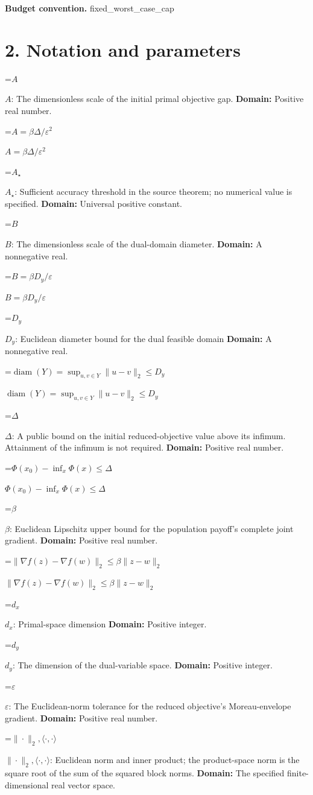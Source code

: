 \documentclass[10pt,a4paper]{article}
\newcommand{\AtlasMath}[1]{\par\begingroup\centering\setbox0=\hbox{$\displaystyle #1$}\ifdim\wd0>1.4\linewidth\typeout{ATLAS WIDE FORMULA: \the\wd0}\fi\ifdim\wd0>\linewidth\resizebox{\linewidth}{!}{\box0}\else\box0\fi\par\endgroup}
\newcommand{\AtlasInlineMath}[1]{\begingroup\setbox0=\hbox{$#1$}\ifdim\wd0>.4\linewidth\endgroup\AtlasMath{#1}\else\endgroup$#1$\fi}
\begin{document}
\textbf{Budget convention.} fixed\_worst\_case\_cap

\section{2. Notation and parameters}
\AtlasInlineMath{A}: The dimensionless scale of the initial primal objective gap. \textbf{Domain:} Positive real number.

\AtlasInlineMath{A=\beta\Delta/\varepsilon^2}

\AtlasInlineMath{A_\star}: Sufficient accuracy threshold in the source theorem; no numerical value is specified. \textbf{Domain:} Universal positive constant.

\AtlasInlineMath{B}: The dimensionless scale of the dual-domain diameter. \textbf{Domain:} A nonnegative real.

\AtlasInlineMath{B=\beta D_y/\varepsilon}

\AtlasInlineMath{D_y}: Euclidean diameter bound for the dual feasible domain \textbf{Domain:} A nonnegative real.

\AtlasInlineMath{\operatorname{diam}(Y)=\sup_{u,v\in Y}\|u-v\|_2\le D_y}

\AtlasInlineMath{\Delta}: A public bound on the initial reduced-objective value above its infimum. Attainment of the infimum is not required. \textbf{Domain:} Positive real number.

\AtlasInlineMath{\Phi(x_0)-\inf_x\Phi(x)\le\Delta}

\AtlasInlineMath{\beta}: Euclidean Lipschitz upper bound for the population payoff's complete joint gradient. \textbf{Domain:} Positive real number.

\AtlasInlineMath{\|\nabla f(z)-\nabla f(w)\|_2\le\beta\|z-w\|_2}

\AtlasInlineMath{d_x}: Primal-space dimension \textbf{Domain:} Positive integer.

\AtlasInlineMath{d_y}: The dimension of the dual-variable space. \textbf{Domain:} Positive integer.

\AtlasInlineMath{\varepsilon}: The Euclidean-norm tolerance for the reduced objective’s Moreau-envelope gradient. \textbf{Domain:} Positive real number.

\AtlasInlineMath{\|\cdot\|_2,\langle\cdot,\cdot\rangle}: Euclidean norm and inner product; the product-space norm is the square root of the sum of the squared block norms. \textbf{Domain:} The specified finite-dimensional real vector space.
\end{document}
